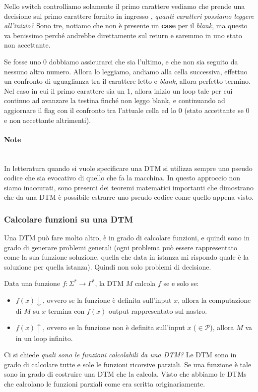 \documentclass{article}
\begin{document}
Nello switch controlliamo
solamente il primo carattere vediamo che prende una decisione sul primo carattere fornito
in ingresso , \textit{quanti caratteri
possiamo leggere all'inizio?} Sono tre, notiamo che non è presente un
\textbf{case} per il \textit{blank}, ma questo va benissimo perché andrebbe
direttamente sul return e saremmo in uno stato non accettante.

Se fosse uno 0 dobbiamo assicurarci che sia l'ultimo, e che non sia seguito
da nessuno altro numero. Allora lo leggiamo, andiamo alla cella successiva,
effettuo un confronto di uguaglianza tra il carattere letto e \textit{blank},
allora perfetto termino. Nel caso in cui il primo carattere sia un 1, allora
inizio un loop tale per cui continuo ad avanzare la testina finché non leggo
blank, e continuando ad aggiornare il flag con il confronto tra l'attuale
cella ed lo 0 (stato accettante se 0 e non accettante altrimenti).

\paragraph{Note}\mbox{}\\
In letteratura quando si vuole specificare una DTM si utilizza sempre uno
pseudo codice che sia evocativo di quello che fa la macchina. In questo approccio
non siamo inaccurati, sono presenti dei teoremi matematici importanti
che dimostrano che da una DTM è possibile estrarre uno pseudo codice
come quello appena visto.

\subsubsection{Calcolare funzioni su una DTM}
Una DTM può fare molto altro, è in grado di calcolare funzioni, e quindi
sono in grado di generare problemi generali (ogni problema può essere
rappresentato come la sua funzione soluzione, quella che data in istanza
mi rispondo quale è la soluzione per quella istanza). Quindi non solo
problemi di decisione.

Data una funzione $f:\Sigma^*\rightarrow\Gamma^*$, la DTM $M$ calcola $f$ se
e solo se:
\begin{itemize}
    \item $f(x)\downarrow$, ovvero se la funzione è definita sull'input $x$,
    allora la computazione di $M$ su $x$ termina con $f(x)$ output rappresentato
    sul nastro.

    \item $f(x)\uparrow$, ovvero se la funzione non è definita sull'input $x$ ($\in\mathcal{P}$), allora $M$ va in un
    loop infinito.
\end{itemize}
Ci si chiede \textit{quali sono le funzioni calcolabili da una DTM?} Le DTM
sono in grado di calcolare tutte e sole le funzioni ricorsive parziali. Se
una funzione è tale sono in grado di costruire una DTM che la calcola.
Visto che abbiamo le DTMs che calcolano le funzioni parziali come era scritta
originariamente.
\end{document}
